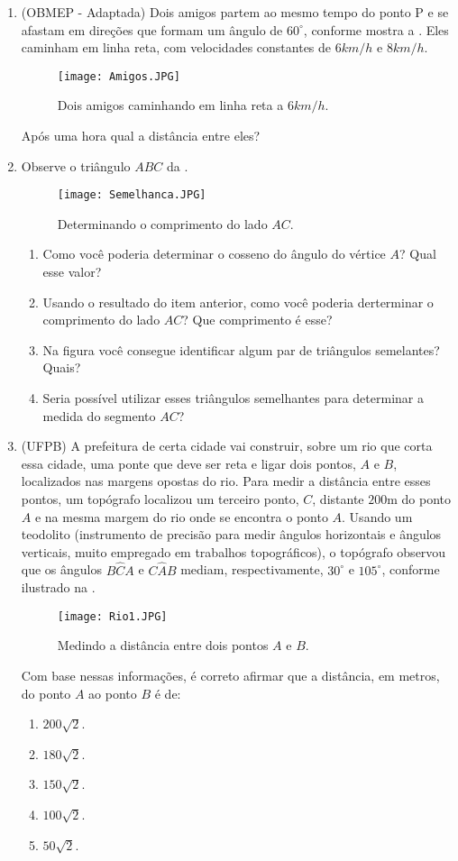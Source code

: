 \begin{enumerate}
\clearpage
\item{}
(OBMEP - Adaptada) Dois amigos partem ao mesmo tempo do ponto P e se afastam em direções que formam um ângulo de $60^\circ$, conforme mostra a . Eles caminham em linha reta, com velocidades constantes de $6 km/h$ e $8 km/h$. 
\begin{figure}[H]
    \centering
    \texttt{[image: Amigos.JPG]}
    \caption{Dois amigos caminhando em linha reta a $6 km/h$.}
    \label{Amigos}
\end{figure}
Após uma hora qual a distância entre eles?


\item{}
Observe o triângulo $ABC$ da .
\begin{figure}[H]
    \centering
    \texttt{[image: Semelhanca.JPG]}
    \caption{Determinando o comprimento do lado $AC$.}
    \label{Semelhanca}
\end{figure}
\begin{enumerate}
    \item Como você poderia determinar o cosseno do ângulo do vértice $A$? Qual esse valor?
    \item Usando o resultado do item anterior, como você poderia derterminar o comprimento do lado $AC$? Que comprimento é esse?
    \item Na figura você consegue identificar algum par de triângulos semelantes? Quais?
    \item Seria possível utilizar esses triângulos semelhantes para determinar a medida do segmento $AC$? 
\end{enumerate}

\item{}
(UFPB) A prefeitura de certa cidade vai construir, sobre um rio que corta essa cidade, uma ponte que deve ser reta e ligar dois pontos, $A$ e $B$, localizados nas margens opostas do rio. Para medir a distância entre esses pontos, um topógrafo localizou um terceiro ponto, $C$, distante $200$m do ponto $A$ e na mesma margem do rio onde se encontra o ponto $A$. Usando um teodolito (instrumento de precisão para medir ângulos horizontais e ângulos verticais, muito empregado em trabalhos topográficos), o topógrafo observou que os ângulos $B\hat{C}A$ e $C\hat{A}B$ mediam, respectivamente, $30^\circ$ e $105^\circ$, conforme ilustrado na .
\begin{figure}[H]
    \centering
    \texttt{[image: Rio1.JPG]}
    \caption{Medindo a distância entre dois pontos $A$ e $B$.}
    \label{Rio1}
\end{figure}
Com base nessas informações, é correto afirmar que a distância, em metros, do ponto $A$ ao ponto
$B$ é de: 
\begin{enumerate}
    \item $200\sqrt{2}$.
    \item $180\sqrt{2}$.
    \item $150\sqrt{2}$.
    \item $100\sqrt{2}$.
    \item $50\sqrt{2}$.
\end{enumerate} 


\end{enumerate}
